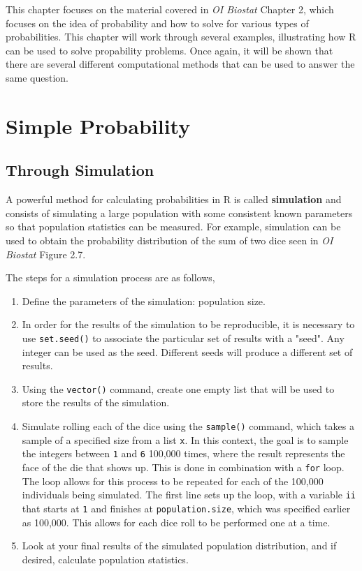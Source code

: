 \vspace{0.5cm} 

This chapter focuses on the material covered in \textit{OI Biostat} Chapter 2, which focuses on the idea of probability and how to solve for various types of probabilities. This chapter will work through several examples, illustrating how \textsf{R} can be used to solve propability problems.  Once again, it will be shown that there are several different computational methods that can be used to answer the same question.  

\section{Simple Probability}
\subsection{Through Simulation}
A powerful method for calculating probabilities in \textsf{R} is called \textbf{simulation} and consists of simulating a large population with some consistent known parameters so that population statistics can be measured.  For example, simulation can be used to obtain the probability distribution of the sum of two dice seen in \textit{OI Biostat} Figure 2.7.  

The steps for a simulation process are as follows, 
\begin{enumerate}
  \item Define the parameters of the simulation: population size.
  
  \item In order for the results of the simulation to be reproducible, it is necessary to use \texttt{set.seed()} to associate the particular set of results with a "seed". Any integer can be used as the seed. Different seeds will produce a different set of results. 
  
  \item Using the \texttt{vector()} command, create one empty list that will be used to store the results of the simulation.  
  
  \item Simulate rolling each of the dice using the  \texttt{sample()} command, which takes a sample of a specified size from a list \texttt{x}. In this context, the goal is to sample the integers between \texttt{1} and \texttt{6} 100,000 times, where the result represents the face of the die that shows up.  This is done in combination with a \texttt{for} loop.  The loop allows for this process to be repeated for each of the 100,000 individuals being simulated.  The first line sets up the loop, with a variable \texttt{ii} that starts at \texttt{1} and finishes at \texttt{population.size}, which was specified earlier as 100,000. This allows for each dice roll to be performed one at a time.
  
  \item Look at your final results of the simulated population distribution, and if desired, calculate population statistics. 

\end{enumerate}


